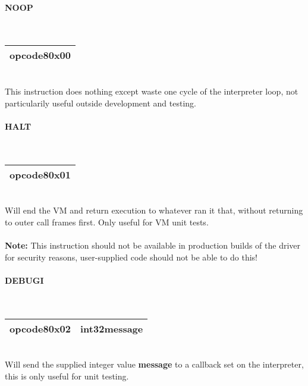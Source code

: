 \documentclass[12pt,a4paper]{article}
\begin{document}

\bigskip
\begin{minipage}{\textwidth}
\paragraph{NOOP}
~\vspace{1em}\\\begin{tabular}{|p{2cm}|}
\hline
opcode8\newline\textbf{0x00} \\
\hline
\end{tabular}\vspace{1em}\\
This instruction does nothing except waste one cycle of the interpreter loop, not particularily useful outside development and testing.
\end{minipage}

\vspace{2em}\begin{minipage}{\textwidth}
\paragraph{HALT}
~\vspace{1em}\\\begin{tabular}{|p{2cm}|}
\hline
opcode8\newline\textbf{0x01} \\
\hline
\end{tabular}\vspace{1em}\\
Will end the VM and return execution to whatever ran it that, without returning to outer call frames first. Only useful for VM unit tests.
\\\\\textbf{Note:} This instruction should not be available in production builds of the driver for security reasons, user-supplied code should not be able to do this!
\end{minipage}

\vspace{2em}\begin{minipage}{\textwidth}
\paragraph{DEBUGI}
~\vspace{1em}\\\begin{tabular}{|p{2cm}|p{8cm}|}
\hline
opcode8\newline\textbf{0x02} & int32\newline\textbf{message} \\
\hline
\end{tabular}\vspace{1em}\\
Will send the supplied integer value \textbf{message} to a callback set on the interpreter, this is only useful for unit testing.
\end{minipage}
\end{document}
